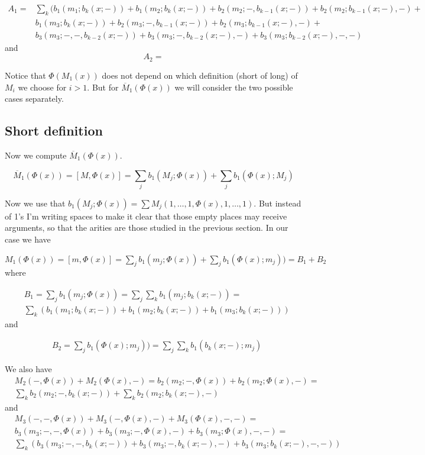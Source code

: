 \documentclass[twoside]{article}
\begin{document}
\begin{align*}
A_1=&\sum_k ( b_1(m_1;b_k(x;-))+b_1(m_2;b_k(x;-))+b_2(m_2;-,b_{k-1}(x;-))+b_2(m_2;b_{k-1}(x;-),-)+\\
&b_1(m_3;b_k(x;-))+b_2(m_3;-,b_{k-1}(x;-))+b_2(m_3;b_{k-1}(x;-),-)+\\
& b_3(m_3;-,-,b_{k-2}(x;-))+b_3(m_3;-,b_{k-2}(x;-),-)+b_3(m_3;b_{k-2}(x;-),-,-)
\end{align*}
and
$$A_2=$$


Notice that $\Phi(M_1(x))$ does not depend on which definition (short of long) of $M_i$ we choose for $i>1$. But for $\overline{M}_1(\Phi(x))$ we will consider the two possible cases separately.

\subsection{Short definition}

Now we compute $\overline{M}_1(\Phi(x))$.

$$\overline{M}_1(\Phi(x))=[M,\Phi(x)]=\sum_j b_1(M_j;\Phi(x))+\sum_j b_1(\Phi(x);M_j)$$

Now we use that $b_1(M_j;\Phi(x))=\sum M_j(1,\dots, 1,\Phi(x),1,\dots, 1)$. But instead of 1's I'm writing spaces to make it clear that those empty places may receive arguments, so that the arities are those studied in the previous section. In our case we have

$
M_1(\Phi(x))=[m,\Phi(x)]=\sum_j b_1(m_j;\Phi(x))+\sum_j b_1(\Phi(x);m_j))=B_1+B_2
$
where

\begin{align*}
&B_1=\sum_j b_1(m_j;\Phi(x))=\sum_j\sum_k b_1(m_j;b_k(x;-))=\\
&\sum_k(b_1(m_1;b_k(x;-))+b_1(m_2;b_k(x;-))+b_1(m_3;b_k(x;-)))
\end{align*}
and

\begin{align*}
&B_2=\sum_j b_1(\Phi(x);m_j))=\sum_j\sum_k b_1(b_k(x;-);m_j)
\end{align*}

We also have
\begin{align*}
&M_2(-,\Phi(x))+M_2(\Phi(x),-)=b_2(m_2;-,\Phi(x))+b_2(m_2;\Phi(x),-)=\\
&\sum_k b_2(m_2; -,b_k(x;-))+\sum_k b_2(m_2;b_k(x;-),-)
\end{align*}
and
\begin{align*}
&M_3(-,-,\Phi(x))+M_3(-,\Phi(x),-)+M_3(\Phi(x),-,-)=\\
&b_3(m_3;-,-,\Phi(x))+b_3(m_3;-,\Phi(x),-)+b_3(m_3;\Phi(x),-,-)=\\
&\sum_k (b_3(m_3; -,-,b_k(x;-))+ b_3(m_3;-,b_k(x;-),-)+b_3(m_3;b_k(x;-),-,-))
\end{align*}
\end{document}
